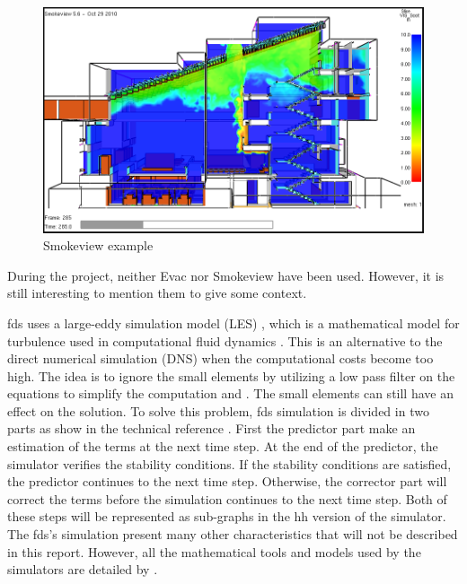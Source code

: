 \begin{figure}[h!]
  \begin{center}
    \includegraphics[scale=0.5]{img/smvexample.png}
    \caption{Smokeview example}
    \label{fig:smvexample}
  \end{center}
\end{figure}

During the project, neither Evac nor Smokeview have been used. However, it is
still interesting to mention them to give some context.

\gls{fds} uses a large-eddy simulation model (LES) \cite{fdsref}, which is a
mathematical model for turbulence used in computational fluid dynamics
\cite{enwiki:les}. This is an alternative to the direct numerical simulation
(DNS) when the computational costs become too high. The idea is to ignore the
small elements by utilizing a low pass filter on the equations to simplify the
computation \cite{enwiki:les} and \cite{ferziger1996large}. The small elements
can still have an effect on the solution. To solve this problem, \gls{fds}
simulation is divided in two parts as show in the technical reference
\cite{fdsref}. First the predictor part make an estimation of the terms at the
next time step. At the end of the predictor, the simulator verifies the
stability conditions. If the stability conditions are satisfied, the predictor
continues to the next time step. Otherwise, the corrector part will correct the
terms before the simulation continues to the next time step. Both of these steps
will be represented as sub-graphs in the \gls{hh} version of the simulator. The
\gls{fds}'s simulation present many other characteristics that will not be
described in this report. However, all the mathematical tools and models used by
the simulators are detailed by \cite{fdsref}.

